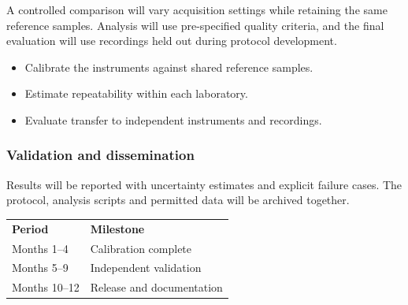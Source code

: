 \documentclass[english,53.01]{proposal}
\begin{document}
A controlled comparison will vary acquisition settings while retaining the same
reference samples. Analysis will use pre-specified quality criteria, and the
final evaluation will use recordings held out during protocol development.

\begin{itemize}
\item Calibrate the instruments against shared reference samples.
\item Estimate repeatability within each laboratory.
\item Evaluate transfer to independent instruments and recordings.
\end{itemize}

\subsubsection{Validation and dissemination}
Results will be reported with uncertainty estimates and explicit failure cases.
The protocol, analysis scripts and permitted data will be archived together.

\begin{tabular}{ll}
\textbf{Period} & \textbf{Milestone} \\
Months 1--4 & Calibration complete \\
Months 5--9 & Independent validation \\
Months 10--12 & Release and documentation
\end{tabular}
\end{document}
